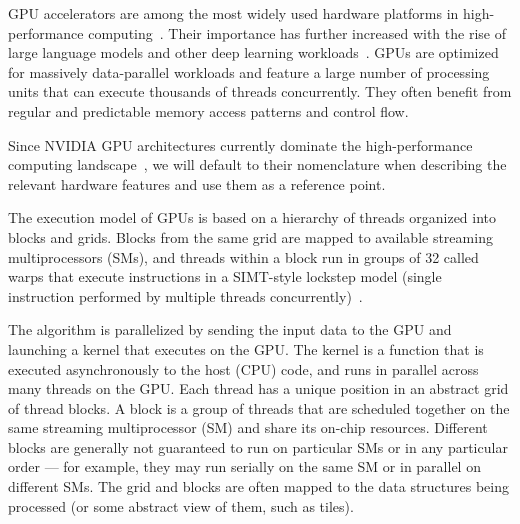GPU accelerators are among the most widely used hardware platforms in high-performance computing~\cite{top500}. Their importance has further increased with the rise of large language models and other deep learning workloads~. GPUs are optimized for massively data-parallel workloads and feature a large number of processing units that can execute thousands of threads concurrently. They often benefit from regular and predictable memory access patterns and control flow.

Since NVIDIA GPU architectures currently dominate the high-performance computing landscape~\cite{top500}, we will default to their nomenclature when describing the relevant hardware features and use them as a reference point.

The execution model of GPUs is based on a hierarchy of threads organized into blocks and grids. Blocks from the same grid are mapped to available streaming multiprocessors (SMs), and threads within a block run in groups of 32 called warps that execute instructions in a SIMT-style lockstep model (single instruction performed by multiple threads concurrently)~\cite{cuda_programming_guide}.

The algorithm is parallelized by sending the input data to the GPU and launching a kernel that executes on the GPU\@. The kernel is a function that is executed asynchronously to the host (CPU) code, and runs in parallel across many threads on the GPU\@. Each thread has a unique position in an abstract grid of thread blocks. A block is a group of threads that are scheduled together on the same streaming multiprocessor (SM) and share its on-chip resources. Different blocks are generally not guaranteed to run on particular SMs or in any particular order --- for example, they may run serially on the same SM or in parallel on different SMs. The grid and blocks are often mapped to the data structures being processed (or some abstract view of them, such as tiles).

